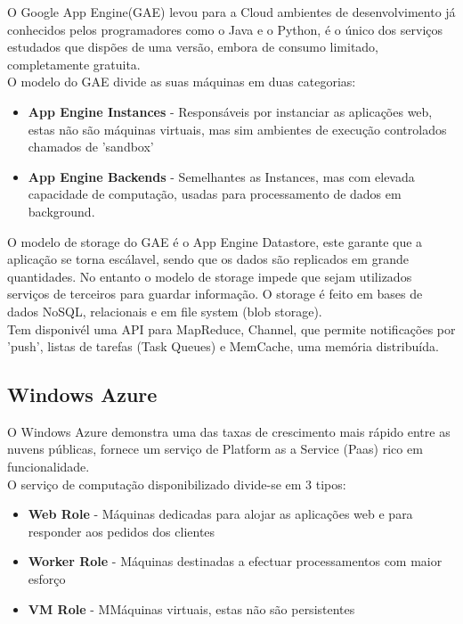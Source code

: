 O Google App Engine(GAE) levou para a Cloud ambientes de desenvolvimento já conhecidos pelos programadores como o Java e o Python, é o único dos serviços estudados que dispões de uma versão, embora de consumo limitado, completamente gratuita.\\
O modelo do GAE divide as suas máquinas em duas categorias:\\
		
\begin{itemize}
\item {\bf App Engine Instances } - Responsáveis por instanciar as aplicações web, estas não são máquinas virtuais, mas sim ambientes de execução controlados chamados de 'sandbox'
\item {\bf App Engine Backends }- Semelhantes as Instances, mas com elevada capacidade de computação, usadas para processamento de dados em background.
\end{itemize}
	
O modelo de storage do GAE é o App Engine Datastore, este garante que a aplicação se torna escálavel, sendo que os dados são replicados em grande quantidades. No entanto o modelo de storage impede que sejam utilizados serviços de terceiros para guardar informação. O storage é feito em bases de dados NoSQL, relacionais e em file system (blob storage).\\
Tem disponivél uma API para MapReduce, Channel, que permite notificações por 'push', listas de tarefas (Task Queues) e MemCache, uma memória distribuída.	

\subsection{Windows Azure}
O Windows Azure demonstra uma das taxas de crescimento mais rápido entre as nuvens públicas, fornece um serviço de Platform as a Service (Paas) rico em funcionalidade.\\
O serviço de computação disponibilizado divide-se em 3 tipos:
	
\begin{itemize}
\item {\bf Web Role} -  Máquinas dedicadas para alojar as aplicações web e para responder aos pedidos dos clientes
\item {\bf Worker Role }- Máquinas destinadas a efectuar processamentos com maior esforço
\item {\bf VM Role }- MMáquinas virtuais, estas não são persistentes
\end{itemize}	

